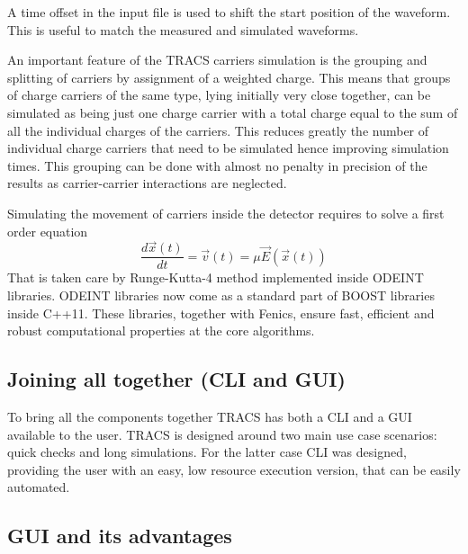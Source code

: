 A time offset in the input file is used to shift the start position of the waveform. This is useful to match the measured and simulated waveforms.


An important feature of the TRACS carriers simulation is the grouping and splitting of carriers by assignment of a weighted charge. This means that groups of charge carriers  of the same type, lying initially very close together, can be simulated as being just one charge carrier with a total charge equal to the sum of all the individual charges of the carriers. This reduces greatly the number of individual charge carriers that need to be simulated hence improving simulation times. This grouping can be done with almost no penalty in precision of the results as carrier-carrier interactions are neglected.

Simulating the movement of carriers inside the detector requires to solve a first order equation\cite{PdeCastro}\[\frac{d\vec{x}(t)}{dt} = \vec{v}(t) = \mu \vec{E}(\vec{x}(t))\]That is taken care by Runge-Kutta-4 method implemented inside ODEINT libraries. ODEINT libraries now come as a standard part of BOOST libraries inside C++11. These libraries, together with Fenics, ensure fast, efficient and robust computational properties at the core algorithms.



\subsection{Joining all together (CLI and GUI)}

To bring all the components together TRACS has both a CLI and a GUI available to the user. TRACS is designed around two main use case scenarios: quick checks and long simulations. For the latter case CLI was designed, providing the user with an easy, low resource execution version, that can be easily automated. 

\subsection{GUI and its advantages}

